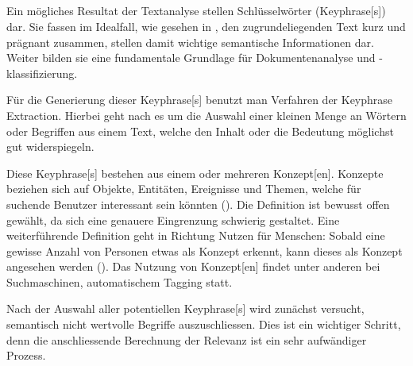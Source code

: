 


\subsection{}\label{Keyphrase-extraction}


Ein mögliches Resultat der \gls{Textanalyse} stellen Schlüsselwörter (\gls{Keyphrase}[s]) dar. Sie fassen im Idealfall, wie gesehen in \cite[S.~85]{Zhang2006}, den zugrundeliegenden Text kurz und prägnant zusammen, stellen damit wichtige semantische Informationen dar. Weiter bilden sie eine fundamentale Grundlage für Dokumentenanalyse und -klassifizierung.


Für die Generierung dieser \gls{Keyphrase}[s] benutzt man Verfahren der \gls{Keyphrase Extraction}. Hierbei geht nach  es \cite{hulth2004} um die Auswahl einer kleinen Menge an Wörtern oder Begriffen aus einem Text, welche den Inhalt oder die Bedeutung möglichst gut widerspiegeln.

Diese \gls{Keyphrase}[s] bestehen aus einem oder mehreren \gls{Konzept}[en]. Konzepte beziehen sich auf Objekte, Entitäten, Ereignisse und Themen, welche für suchende Benutzer interessant sein könnten (\cite{dalvi2009web}). Die Definition ist bewusst offen gewählt, da sich eine genauere Eingrenzung schwierig gestaltet. Eine weiterführende Definition geht in Richtung Nutzen für Menschen: Sobald eine gewisse Anzahl von Personen etwas als Konzept erkennt, kann dieses als Konzept angesehen werden (\cite{parameswaran2010towards}). Das Nutzung von \gls{Konzept}[en] findet unter anderen bei Suchmaschinen, automatischem Tagging statt.

Nach der Auswahl aller potentiellen \gls{Keyphrase}[s] wird zunächst versucht, semantisch nicht wertvolle Begriffe auszuschliessen. Dies ist ein wichtiger Schritt, denn die anschliessende Berechnung der Relevanz ist ein sehr aufwändiger Prozess. 




